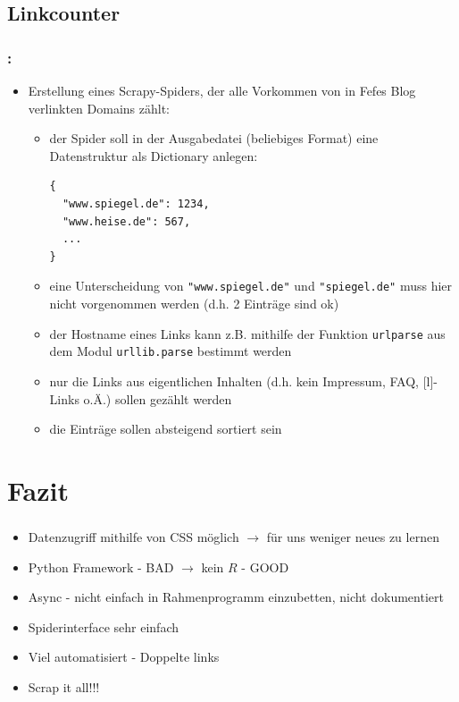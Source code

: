 \documentclass{beamer}
\begin{document}
\subsection{Linkcounter}
\begin{frame}[fragile]
	\frametitle{\insertsection{}: \insertsubsection{}}
	\begin{itemize}
		\item Erstellung eines Scrapy-Spiders, der alle Vorkommen von in Fefes Blog
		verlinkten Domains zählt: \begin{itemize}
			\item der Spider soll in der Ausgabedatei (beliebiges Format) eine Datenstruktur als Dictionary anlegen: \begin{lstlisting} 
{
  "www.spiegel.de": 1234,
  "www.heise.de": 567,
  ...
}
			\end{lstlisting}
		\item eine Unterscheidung von \lstinline|"www.spiegel.de"| und \lstinline|"spiegel.de"| muss hier nicht vorgenommen werden (d.h. 2 Einträge sind ok)
		\item der Hostname eines Links kann z.B. mithilfe der Funktion \lstinline|urlparse| aus dem Modul \lstinline|urllib.parse| bestimmt werden
		\item nur die Links aus eigentlichen Inhalten (d.h. kein Impressum, FAQ,
		[l]-Links o.Ä.) sollen gezählt werden
		\item die Einträge sollen absteigend sortiert sein
		\end{itemize}
	\end{itemize}
\end{frame}


\section{Fazit}
\begin{frame}
	\frametitle{\insertsection{}}
	\begin{itemize}
	  \item Datenzugriff mithilfe von CSS möglich $\rightarrow$ für uns weniger
	  neues zu lernen
	  \item Python Framework - BAD $\rightarrow$ kein $R$ - GOOD
	  \item Async - nicht einfach in Rahmenprogramm einzubetten, nicht dokumentiert
	  \item Spiderinterface sehr einfach
	  \item Viel automatisiert - Doppelte links
	  \item Scrap it all!!!
	\end{itemize}
\end{frame}
\end{document}
